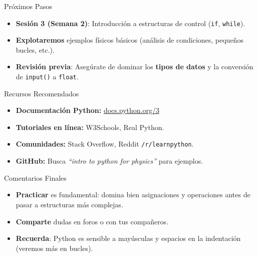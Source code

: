 \documentclass[10pt]{beamer}
\begin{document}
\begin{frame}{Próximos Pasos}
  \begin{itemize}
    \item \textbf{Sesión 3 (Semana 2)}: Introducción a estructuras de control (\texttt{if}, \texttt{while}).
    \item \textbf{Explotaremos} ejemplos físicos básicos (análisis de condiciones, pequeños bucles, etc.).
    \item \textbf{Revisión previa}: Asegúrate de dominar los \textbf{tipos de datos} y la conversión de \texttt{input()} a \texttt{float}.
  \end{itemize}
\end{frame}

\begin{frame}{Recursos Recomendados}
  \begin{itemize}
    \item \textbf{Documentación Python:} \href{https://docs.python.org/3/}{docs.python.org/3}
    \item \textbf{Tutoriales en línea:} W3Schools, Real Python.
    \item \textbf{Comunidades:} Stack Overflow, Reddit \texttt{/r/learnpython}.
    \item \textbf{GitHub:} Busca \emph{“intro to python for physics”} para ejemplos.
  \end{itemize}
\end{frame}

\begin{frame}{Comentarios Finales}
  \begin{itemize}
    \item \textbf{Practicar} es fundamental: domina bien asignaciones y operaciones antes de pasar a estructuras más complejas.
    \item \textbf{Comparte} dudas en foros o con tus compañeros.
    \item \textbf{Recuerda}: Python es sensible a mayúsculas y espacios en la indentación (veremos más en bucles).
  \end{itemize}
\end{frame}
\end{document}
